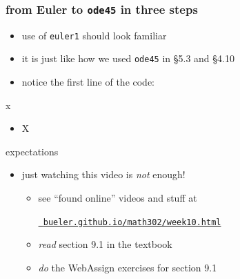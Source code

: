 \documentclass[urlcolor=blue,dvipsnames]{beamer}
\begin{document}
\begin{frame}[fragile]
\frametitle{from Euler to \texttt{ode45} in three steps}

\begin{itemize}
\item use of \texttt{euler1} should look familiar
\item it is just like how we used \texttt{ode45} in \S5.3 and \S4.10
\item notice the first line of the code:
\end{itemize}
\end{frame}


\begin{frame}{x}

\begin{itemize}
\item X
\end{itemize}
\end{frame}




\begin{frame}{expectations}

\begin{itemize}
\item just watching this video is \emph{not} enough!
     \begin{itemize}
     \item see ``found online'' videos and stuff at

     \centerline{\href{https://bueler.github.io/math302/week10.html}{\tt \color{cyan} bueler.github.io/math302/week10.html}}
     \item \emph{read} section 9.1 in the textbook
     \item \emph{do} the WebAssign exercises for section 9.1
     \end{itemize}
\end{itemize}
\end{frame}
\end{document}
